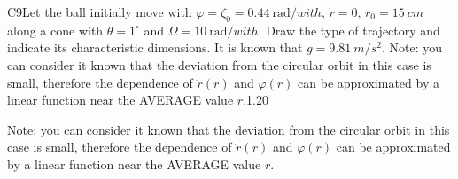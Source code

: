 \documentclass[11pt,a4paper]{article}
\begin{document}
\begin{solcard}{C9}{Let the ball initially move with $\dot{\varphi}=\zeta_0=0.44~\mathrm{rad}/with$, $\dot{r} = 0$, $r_0 = 15~cm$ along a cone with $\theta = 1^\circ$ and $\Omega = 10~\mathrm{rad}/with$. Draw the type of trajectory and indicate its characteristic dimensions. It is known that $g = 9.81 ~m/s^2$. Note: you can consider it known that the deviation from the circular orbit in this case is small, therefore the dependence of $\ddot{r}(r)$ and $\dot\varphi (r)$ can be approximated by a linear function near the AVERAGE value $r$.}{1.20}

Note: you can consider it known that the deviation from the circular orbit in this case is small, therefore the dependence of $\ddot{r}(r)$ and $\dot\varphi (r)$ can be approximated by a linear function near the AVERAGE value $r$.



\end{solcard}
\end{document}

